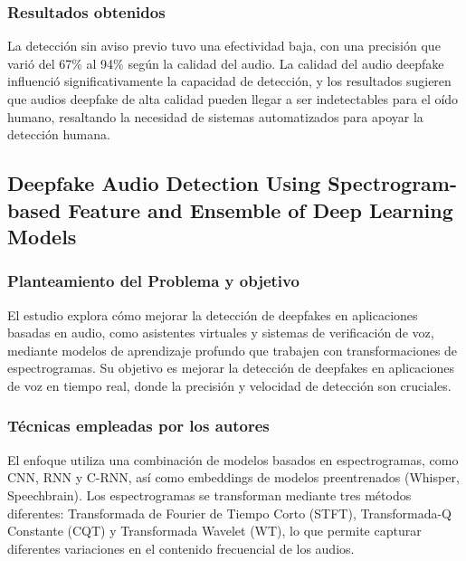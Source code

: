 \subsubsection{Resultados obtenidos}
La detección sin aviso previo tuvo una efectividad baja, con una precisión que varió del 67\% al 94\% según la calidad del audio. La calidad del audio deepfake influenció significativamente la capacidad de detección, y los resultados sugieren que audios deepfake de alta calidad pueden llegar a ser indetectables para el oído humano, resaltando la necesidad de sistemas automatizados para apoyar la detección humana.

\subsection{Deepfake Audio Detection Using Spectrogram-based Feature and Ensemble of Deep Learning Models \citep*{li2023}}

\subsubsection{Planteamiento del Problema y objetivo }
El estudio explora cómo mejorar la detección de deepfakes en aplicaciones basadas en audio, como asistentes virtuales y sistemas de verificación de voz, mediante modelos de aprendizaje profundo que trabajen con transformaciones de espectrogramas. Su objetivo es mejorar la detección de deepfakes en aplicaciones de voz en tiempo real, donde la precisión y velocidad de detección son cruciales.

\subsubsection{Técnicas empleadas por los autores}
El enfoque utiliza una combinación de modelos basados en espectrogramas, como CNN, RNN y C-RNN, así como embeddings de modelos preentrenados (Whisper, Speechbrain). Los espectrogramas se transforman mediante tres métodos diferentes: Transformada de Fourier de Tiempo Corto (STFT), Transformada-Q Constante (CQT) y Transformada Wavelet (WT), lo que permite capturar diferentes variaciones en el contenido frecuencial de los audios.

